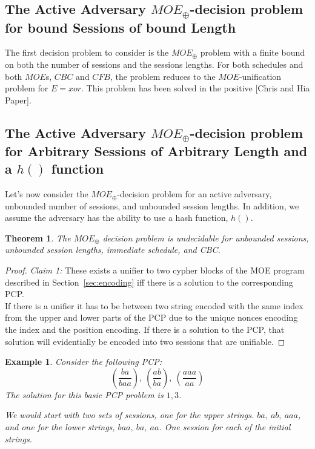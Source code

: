 \documentclass{easychair}
\newtheorem{example}{Example}
\newtheorem{theorem}{Theorem}
\begin{document}
{\subsection{The Active Adversary $MOE_{\oplus}$-decision problem for bound Sessions of bound Length}
The first decision problem to consider is the $MOE_{\oplus}$
problem with a finite bound on both the number of sessions and
the sessions lengths. 
For both schedules and both $MOE$s, $CBC$ and $CFB$, the problem
reduces to the $MOE$-unification problem for $E=xor$. This problem
has been solved in the positive [Chris and Hia Paper].

\subsection{The Active Adversary $MOE_{\oplus}$-decision problem for Arbitrary Sessions of Arbitrary Length and a $h()$ function}
Let's now consider the $MOE_{\oplus}$-decision problem
for an active adversary, unbounded number of sessions, and unbounded session lengths. In addition, we assume the adversary has the ability 
to use a hash function, $h()$.
 
\begin{theorem}\label{thm:unbounded_unbounded}
The $MOE_{\oplus}$ decision problem is undecidable for unbounded 
sessions, unbounded session lengths, immediate schedule, and CBC. 
\end{theorem}
\begin{proof}
	\textit{Claim 1:} These exists a unifier to two cypher blocks
	of the MOE program described in Section~\ref{sec:encoding} iff
	there is a solution to the corresponding PCP.
	\noindent
	\\
	If there is a unifier it has to be between two string encoded 
	with the same index from the upper and lower parts of the PCP
	due to the unique nonces encoding the index and the position encoding.
	If there is a solution to the PCP, that solution will evidentially
	be encoded into two sessions that are unifiable. 
\end{proof}

\begin{example}
	Consider the following PCP:
	\[
	(\frac{ba}{baa}),~(\frac{ab}{ba}),~(\frac{aaa}{aa})
	\]
	The solution for this basic PCP problem is $1,3$.
	
	We would start with two sets of sessions, one for the 
	upper strings. $ba, ~ab, ~aaa$, and one for the lower
	strings, $baa, ~ba, ~aa$. One session for each of the initial strings. 
	

\end{example}}
\end{document}
